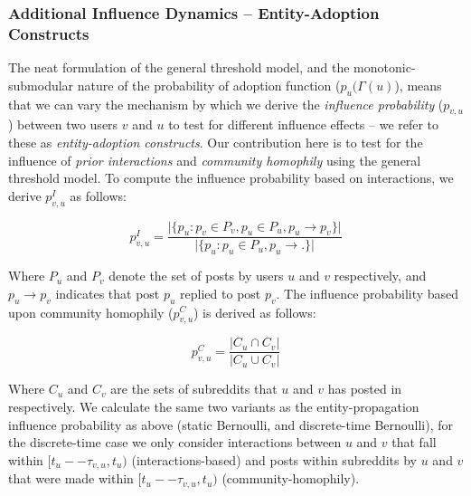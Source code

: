 \documentclass[sigconf]{acmart}
\begin{document}
\subsubsection{Additional Influence Dynamics -- Entity-Adoption Constructs}
The neat formulation of the general threshold model, and the monotonic-submodular nature of the probability of adoption function ($p_u(\Gamma(u)$), means that we can vary the mechanism by which we derive the \emph{influence probability} ($p_{v,u}$) between two users $v$ and $u$ to test for different influence effects -- we refer to these as \emph{entity-adoption constructs}.
Our contribution here is to test for the influence of \emph{prior interactions} and \emph{community homophily} using the general threshold model.
To compute the influence probability based on interactions, we derive $p^I_{v,u}$ as follows:

\begin{equation}
p^{I}_{v,u} = \frac{\vert \{ p_u : p_v \in P_v, p_u \in P_u, p_u \rightarrow p_v \} \vert}{\vert \{ p_u : p_u \in P_u, p_u \rightarrow . \} \vert}
\end{equation}

Where $P_u$ and $P_v$ denote the set of posts by users $u$ and $v$ respectively, and $p_u \rightarrow p_v$ indicates that post $p_u$ replied to post $p_v$.
The influence probability based upon community homophily ($p_{v,u}^C$) is derived as follows:

\begin{equation}
p^C_{v,u} = \frac{\vert C_u \cap C_v \vert}{\vert C_u \cup C_v \vert}
\end{equation}

Where $C_u$ and $C_v$ are the sets of subreddits that $u$ and $v$ has posted in respectively.
We calculate the same two variants as the entity-propagation influence probability as above (static Bernoulli, and discrete-time Bernoulli), for the discrete-time case we only consider interactions between $u$ and $v$ that fall within $[t_u -- \tau_{v,u}, t_u)$ (interactions-based) and posts within subreddits by $u$ and $v$ that were made within $[t_u -- \tau_{v,u}, t_u)$ (community-homophily).
\end{document}
